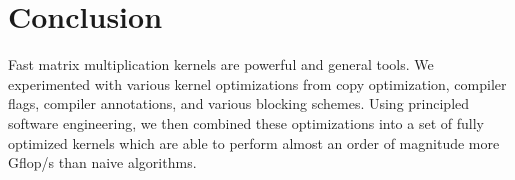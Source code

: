 \section{Conclusion}\label{sec:conc}
Fast matrix multiplication kernels are powerful and general tools. We
experimented with various kernel optimizations from copy optimization, compiler
flags, compiler annotations, and various blocking schemes. Using principled
software engineering, we then combined these optimizations into a set of fully
optimized kernels which are able to perform almost an order of magnitude more
Gflop/s than naive algorithms.
